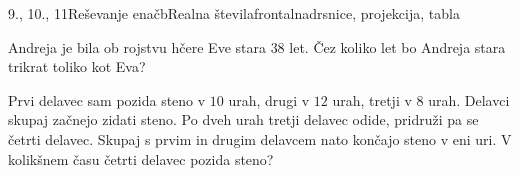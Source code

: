 \begin{priprava}{9., 10., 11}{}{Reševanje enačb}{Realna števila}{frontalna}{drsnice, projekcija, tabla}
        


        
            \begin{naloga}
                Andreja je bila ob rojstvu hčere Eve stara $38$ let. Čez koliko let bo Andreja stara trikrat toliko kot Eva?
                
            \end{naloga}

            \begin{naloga}
                Prvi delavec sam pozida steno v  $10$ urah, drugi v $12$ urah, tretji v $8$ urah. 
                Delavci skupaj začnejo zidati steno. Po dveh urah tretji delavec odide, pridruži pa se četrti delavec. 
                Skupaj s prvim in drugim delavcem nato končajo steno v eni uri. V kolikšnem času četrti delavec pozida steno?
                
            \end{naloga}

        



    
\end{priprava}